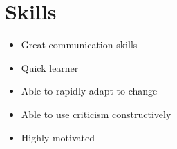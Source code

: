 \documentclass[a4paper]{cv}
\begin{document}
\begin{minipage}[t]{0.33\textwidth}
\section{Skills}
\begin{flushleft}
\begin{itemize}
    \item Great communication skills
    \item Quick learner
    \item Able to rapidly adapt to change
    \item Able to use criticism constructively
    \item Highly motivated
\end{itemize}
\end{flushleft}
\end{minipage}
\hspace{0.1cm}
{\color{headings}\vrule}
\hspace{0.1cm}
\end{document}
